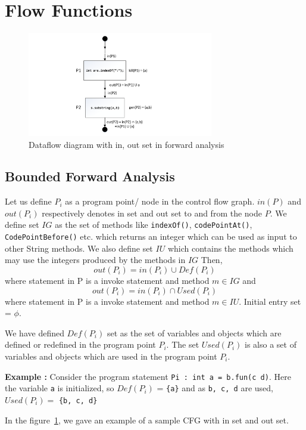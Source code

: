 \section{Flow Functions}
\label{sec:flowFunctions}

\begin{figure}[htb]
\centering
\includegraphics[width=3.2in]{images/dataflow.pdf}
\caption{Dataflow diagram with in, out set in forward analysis}
\label{fig:dataflow}
\end{figure}

\subsection{Bounded Forward Analysis}
\label{subsec:boundedForward}

Let us define $P_i$ as a program point/ node in the control flow graph. $in(P)$
and $out(P_i)$ respectively denotes in set and out set to and from the node $P$.
We define set $IG$ as the set of methods like \texttt{indexOf()},
\texttt{codePointAt()}, \texttt{CodePointBefore()} etc. which returns an integer
which can be used as input to other String methods. We also define set $IU$
which contains the methods which may use the integers produced by the methods in
$IG$ Then, 
$$out(P_i) = in(P_i) \cup Def(P_i)$$ where statement in P is a invoke statement
and method $m \in IG$ and
$$out(P_i) = in(P_i) \cap Used(P_i)$$ where statement in P is a invoke statement
and method $m \in IU$. Initial entry set = ${\phi}$.


We have defined $Def(P_i)$ set as the set of variables and objects which are
defined or redefined in the program point $P_i$. The set $Used(P_i)$ is also a
set of variables and objects which are used in the program point $P_i$.

\textbf{Example : } Consider the program statement \texttt{Pi : int a = b.fun(c
d)}.
Here the variable \texttt{a} is initialized, so $Def(P_i)$ = \texttt{\{a\}} and
as
\texttt{b, c, d} are used, $Used(P_i) =$ \texttt{\{b, c, d\}}

In the figure~\ref{fig:dataflow}, we gave an example of a sample CFG with in set
and out set.


